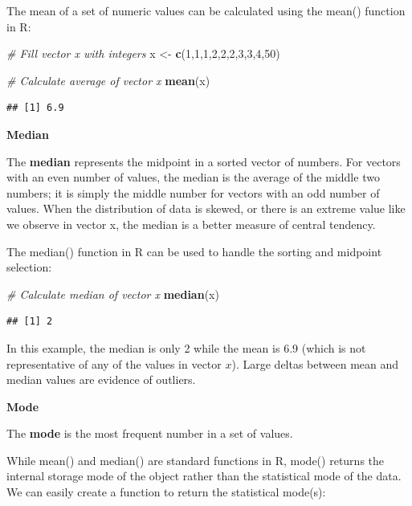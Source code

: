 \documentclass[]{book}
\newenvironment{Shaded}{\begin{snugshade}}{\end{snugshade}}
\newcommand{\CommentTok}[1]{\textcolor[rgb]{0.56,0.35,0.01}{\textit{#1}}}
\newcommand{\DecValTok}[1]{\textcolor[rgb]{0.00,0.00,0.81}{#1}}
\newcommand{\KeywordTok}[1]{\textcolor[rgb]{0.13,0.29,0.53}{\textbf{#1}}}
\newcommand{\NormalTok}[1]{#1}
\newcommand{\StringTok}[1]{\textcolor[rgb]{0.31,0.60,0.02}{#1}}
\begin{document}
The mean of a set of numeric values can be calculated using the mean() function in R:

\begin{Shaded}
\begin{Highlighting}[]
\CommentTok{# Fill vector x with integers}
\NormalTok{x <-}\StringTok{ }\KeywordTok{c}\NormalTok{(}\DecValTok{1}\NormalTok{,}\DecValTok{1}\NormalTok{,}\DecValTok{1}\NormalTok{,}\DecValTok{2}\NormalTok{,}\DecValTok{2}\NormalTok{,}\DecValTok{2}\NormalTok{,}\DecValTok{3}\NormalTok{,}\DecValTok{3}\NormalTok{,}\DecValTok{4}\NormalTok{,}\DecValTok{50}\NormalTok{)}

\CommentTok{# Calculate average of vector x}
\KeywordTok{mean}\NormalTok{(x)}
\end{Highlighting}
\end{Shaded}

\begin{verbatim}
## [1] 6.9
\end{verbatim}

\textbf{Median}

The \textbf{median} represents the midpoint in a sorted vector of numbers. For vectors with an even number of values, the median is the average of the middle two numbers; it is simply the middle number for vectors with an odd number of values. When the distribution of data is skewed, or there is an extreme value like we observe in vector x, the median is a better measure of central tendency.

The median() function in R can be used to handle the sorting and midpoint selection:

\begin{Shaded}
\begin{Highlighting}[]
\CommentTok{# Calculate median of vector x}
\KeywordTok{median}\NormalTok{(x)}
\end{Highlighting}
\end{Shaded}

\begin{verbatim}
## [1] 2
\end{verbatim}

In this example, the median is only 2 while the mean is 6.9 (which is not representative of any of the values in vector \(x\)). Large deltas between mean and median values are evidence of outliers.

\textbf{Mode}

The \textbf{mode} is the most frequent number in a set of values.

While mean() and median() are standard functions in R, mode() returns the internal storage mode of the object rather than the statistical mode of the data. We can easily create a function to return the statistical mode(s):
\end{document}
